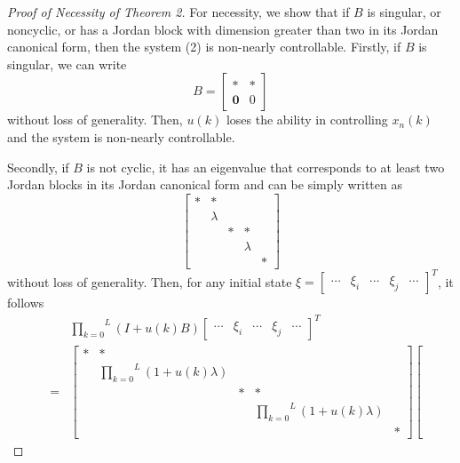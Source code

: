 \documentclass[journal,a4paper,12pt,onecolumn]{IEEEtran}
\begin{document}
\begin{proof}[Proof of Necessity of Theorem 2]
For necessity, we show that if $B$ is singular, or noncyclic, or has a
Jordan block with dimension greater than two in its Jordan canonical form,
then the system (2) is non-nearly controllable. Firstly, if $B$ is singular,
we can write\begin{equation*}
B=\left[
\begin{array}{cc}
\ast & \ast \\
\mathbf{0} & 0\end{array}\right]
\end{equation*}without loss of generality. Then, $u(k)$ loses the ability in controlling $x_{n}(k)$ and the system is non-nearly controllable.

Secondly, if $B$ is not cyclic, it has an eigenvalue that corresponds to at
least two Jordan blocks in its Jordan canonical form and can be simply
written as\begin{equation*}
\left[
\begin{array}{ccccc}
\ast & \ast &  &  &  \\
& \lambda &  &  &  \\
&  & \ast & \ast &  \\
&  &  & \lambda &  \\
&  &  &  & \ast \end{array}\right]
\end{equation*}without loss of generality. Then, for any initial state $\xi =\left[
\begin{array}{ccccc}
\cdots & \xi _{i} & \cdots & \xi _{j} & \cdots \end{array}\right] ^{T}$, it follows\begin{eqnarray*}
&&\overset{L}{\underset{k=0}{\prod }}\left( I+u\left( k\right) B\right) \left[
\begin{array}{ccccc}
\cdots & \xi _{i} & \cdots & \xi _{j} & \cdots \end{array}\right] ^{T} \\
&=&\left[
\begin{array}{ccccc}
\ast & \ast &  &  &  \\
& \overset{L}{\underset{k=0}{\prod }}\left( 1+u\left( k\right) \lambda
\right) &  &  &  \\
&  & \ast & \ast &  \\
&  &  & \overset{L}{\underset{k=0}{\prod }}\left( 1+u\left( k\right) \lambda
\right) &  \\
&  &  &  & \ast \end{array}\right] \left[

\end{eqnarray*}
\end{proof}
\end{document}
